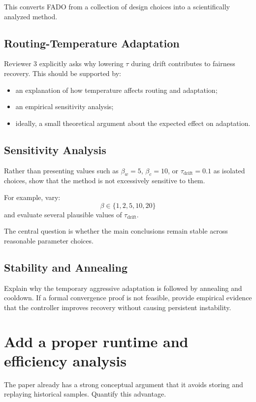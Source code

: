 \documentclass[11pt,a4paper]{article}
\begin{document}
This converts FADO from a collection of design choices into a
scientifically analyzed method.

\subsection{Routing-Temperature Adaptation}

Reviewer 3 explicitly asks why lowering $\tau$ during drift
contributes to fairness recovery. This should be supported by:
\begin{itemize}[leftmargin=*]
  \item an explanation of how temperature affects routing and adaptation;
  \item an empirical sensitivity analysis;
  \item ideally, a small theoretical argument about the expected
    effect on adaptation.
\end{itemize}

\subsection{Sensitivity Analysis}

Rather than presenting values such as $\beta_w=5$, $\beta_c=10$, or
$\tau_{\mathrm{drift}}=0.1$ as isolated choices, show that the method
is not excessively sensitive to them.

For example, vary:
\[
  \beta \in \{1,2,5,10,20\}
\]
and evaluate several plausible values of $\tau_{\mathrm{drift}}$.

The central question is whether the main conclusions remain stable
across reasonable parameter choices.

\subsection{Stability and Annealing}

Explain why the temporary aggressive adaptation is followed by
annealing and cooldown. If a formal convergence proof is not
feasible, provide empirical evidence that the controller improves
recovery without causing persistent instability.

\section{Add a proper runtime and efficiency analysis}

The paper already has a strong conceptual argument that it avoids
storing and replaying historical samples. Quantify this advantage.
\end{document}
